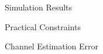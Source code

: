 \documentclass[journal]{IEEEtran}
\begin{document}
\begin{section}{Simulation Results}
\begin{subsection}{Practical Constraints}
\begin{subsubsection}{Channel Estimation Error}
		\end{subsubsection}
	\end{subsection}
\end{section}
\end{document}
